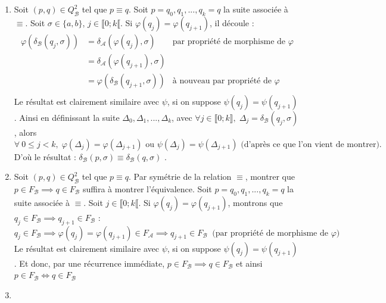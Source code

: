 \documentclass{article}
\begin{document}
\begin{enumerate}
        \item Soit $(p, q) \in Q_\mathcal{B}^2$ tel que $p \equiv q$. Soit $p = q_0, q_1, ..., q_k = q$ la suite associée à $\equiv$. \newline 
        Soit $\sigma \in \{a , b \}$, $j \in \llbracket 0;k \llbracket$. Si $\varphi(q_j) = \varphi(q_{j + 1})$, il découle :
        \begin{align*}
            \varphi(\delta_\mathcal{B}(q_j, \sigma)) &= \delta_\mathcal{A}(\varphi(q_j), \sigma) & \text{par propriété de morphisme de $\varphi$} \\
                                                    &= \delta_\mathcal{A}(\varphi(q_{j + 1}), \sigma) \\
                                                    &= \varphi(\delta_\mathcal{B}(q_{j + 1}, \sigma)) & \text{à nouveau par propriété de $\varphi$} \\
        \end{align*}
        Le résultat est clairement similaire avec $\psi$, si on suppose $\psi(q_j) = \psi(q_{j + 1})$. \newline
        Ainsi en définissant la suite $\Delta_0,\Delta_1, ..., \Delta_k$, avec $\forall j \in \llbracket 0 ; k \rrbracket, \; \Delta_j = \delta_\mathcal{B}(q_j, \sigma)$, alors
        \begin{equation*}
            \forall \: 0 \leq j < k, \; \varphi(\Delta_j) = \varphi(\Delta_{j + 1}) \text{ ou } \psi(\Delta_j) = \psi(\Delta_{j + 1}) \text{ (d'après ce que l'on vient de montrer).}
        \end{equation*}
        D'où le résultat : $\boxed{\delta_\mathcal{B}(p, \sigma) \equiv \delta_\mathcal{B}(q, \sigma)}$ .
        \item Soit $(p, q) \in Q_\mathcal{B}^2$ tel que $p \equiv q$. Par symétrie de la relation $\equiv$, montrer que $ p \in F_\mathcal{B} \implies q \in F_\mathcal{B}$ suffira à montrer l'équivalence. \newline 
        Soit $p = q_0, q_1, ..., q_k = q$ la suite associée à $\equiv$. \newline
        Soit $j \in \llbracket 0;k \llbracket$. Si $\varphi(q_j) = \varphi(q_{j + 1})$, montrons que $q_j \in F_\mathcal{B} \implies q_{j + 1} \in F_\mathcal{B}$ : 
        \begin{equation*}
            q_j \in F_\mathcal{B} \implies \varphi(q_j) = \varphi(q_{j + 1}) \in F_\mathcal{A} \implies q_{j + 1} \in F_\mathcal{B} \;\; \text{(par propriété de morphisme de $\varphi$)}
        \end{equation*}
        Le résultat est clairement similaire avec $\psi$, si on suppose $\psi(q_j) = \psi(q_{j + 1})$. \newline
        Et donc, par une récurrence immédiate, $p \in F_\mathcal{B} \implies q \in F_\mathcal{B}$ et ainsi $\boxed{p \in F_\mathcal{B} \Longleftrightarrow q \in F_\mathcal{B}}$

        \item 
\end{enumerate}
\end{document}
